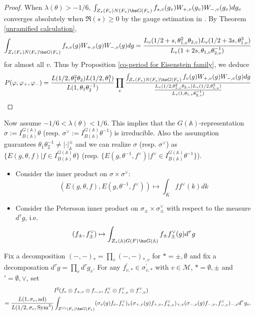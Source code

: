 \documentclass[11pt,reqno]{amsart}
\newcommand{\BA}{{\mathbb {A}}} \newcommand{\BB}{{\mathbb {B}}}
\newcommand{\CM}{{\mathcal {M}}} \newcommand{\CN}{{\mathcal {N}}}
\newcommand{\ad}{{\mathrm{ad}}}\newcommand{\al}{{\mathrm{al}}}
\newcommand{\Sym}{{\mathrm{Sym}}}\newcommand{\sgn}{{\mathrm{sgn}}}
\theoremstyle{plain}
\theoremstyle{remark} \newtheorem{remark}[thm]{Remark}
\theoremstyle{definition} \newtheorem{exercise}[thm]{Exercise}
\theoremstyle{definition} \newtheorem{example}[thm]{Example} \newtheorem{condition}[thm]{Condition}
\numberwithin{equation}{section}
\renewcommand{\-}{\text{--}}
\begin{document}
\begin{proof}
When $\lambda(\theta)>-1/6$, $\int_{Z_*(F_v)N(F_v)\bs G(F_v)}f_{s,v}(g_v)W_{+,v}(g_v)W_{-,v}(g_v)dg_v$ converges absolutely when $\Re(s)\geq0$ by the gauge estimation in \cite[Theorem I.4.1]{KP84}. By Theorem \ref{unramified calculation}, 
  \[\int_{Z_*(F_v)N(F_v)\bs G(F_v)}f_{s,v}(g)W_{+,v}(g)W_{-,v}(g)dg=\frac{L_v(1/2+s,\theta_{1,v}^2\theta_{2,v})L_v(1/2+3s,\theta_{1,v}^3)}{L_v(1+2s,\theta_{1,v}\theta_{2,v}^{-1})}\]
 for almost all $v$. Thus by Proposition \ref{co-period for Eisenstein family}, we deduce 
 \[P(\varphi,\varphi_+,\varphi_{-})=\frac{L(1/2,\theta_1^2\theta_2)L(1/2,\theta_1^3)}{L(1,\theta_1\theta_2^{-1})}\prod_{v}\frac{\int_{Z_*(F_v)N(F_v)\bs G(F_v)}f_v(g)W_{+,v}(g)W_{-,v}(g)dg}{\frac{L_v(1/2,\theta_{1,v}^2\theta_{2,v})L_v(1/2,\theta_{1,v}^3)}{L_v(1,\theta_{1,v}\theta_{2,v}^{-1})}}\]
\end{proof}
Now assume $-1/6<\lambda(\theta)<1/6$. This implies that the $G(\BA)$-representation $\sigma:=I_{B(\BA)}^{G(\BA)}\theta$ (resp.  $\sigma^\vee:=I_{B(\BA)}^{G(\BA)}\theta^{-1}$) is irreducible. Also the assumption guarantees $\theta_1\theta_2^{-1}\neq|\cdot|_\BA^{\pm}$ and we can realize $\sigma$ (resp. $\sigma^\vee$) as  $\{E(g,\theta, f)| f\in I_{B(\BA)}^{G(\BA)}\theta\}$ (resp. $\{E(g,\theta^{-1}, f^\vee)| f^\vee\in I_{B(\BA)}^{G(\BA)}\theta^{-1}\}$).  \begin{itemize}
    \item Consider the inner product on $\sigma\times\sigma^\vee$:
\[\left(E(g,\theta,f),E(g,\theta^{-1},f^\vee)\right)\mapsto \int_K ff^\vee(k)dk\]
\item Consider the Petersson inner product on $\sigma_{\pm}\times\sigma_{\pm}^\vee$ with respect to the measure $d^\tau g$, i.e. 
\[(f_\pm,f_\pm^\vee)\mapsto \int_{Z_*(\BA)G(F)\bs G(\BA)}f_\pm f_\pm^\vee(g)d^\tau g\]
\end{itemize}
 Fix a decomposition $(-,-)_*=\prod_v (-,-)_{*,v}$ for $*=\pm,\emptyset$ and fix a decomposation $d^\tau g=\prod_v d^\tau g_v$.  For any $f_{v,*}^\prime\in\sigma_{v,*}^\prime$ with $v\in\CM$, $*=\emptyset,\pm$ and $\prime=\emptyset,\vee$, set 
\begin{align*}&I^\sharp(f_v\otimes f_{+,v}\otimes f_{-,v},f_v^\vee\otimes f_{+,v}^\vee\otimes f_{-,v}^\vee)\\
=\frac{L(1,\sigma_v,\ad)}{L(1/2,\sigma_v,\Sym^3)}&\int_{Z^{(c)}(F_v)\bs G(F_v)}(\sigma_v(g)f_v,f_v^\vee)_v(\sigma_{+,v}(g)f_{+,v},f_{+,v}^\vee)_{+,v}(\sigma_{-,v}(g)f_{-,v},f_{-,v}^\vee)_{-,v}d^\tau g_v.
\end{align*}
\end{document}
